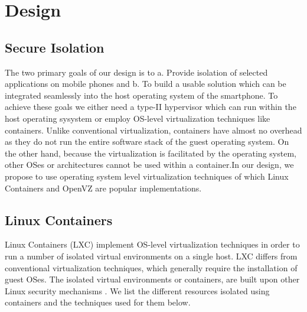 \section{Design}
\label{sec:design}

\subsection{Secure Isolation}
The two primary goals of our design is to a. Provide isolation of selected applications on mobile phones and b. To build a usable solution which can be integrated seamlessly into the host operating system of the smartphone. To achieve these goals we either need a type-II hypervisor which can run within the host operating sysystem or employ OS-level virtualization techniques like containers.  Unlike conventional virtualization, containers have almost no overhead as they do not run the entire software stack of the guest operating system.  On the other hand, because the virtualization is facilitated by the operating system, other OSes or architectures cannot be used within a container.In our design, we propose to use operating system level virtualization techniques of which Linux Containers and OpenVZ \cite{OpenVZ} are popular implementations.\\
 
\subsection{Linux Containers}
Linux Containers (LXC) implement OS-level virtualization techniques in order to run a number of isolated virtual environments on a single host.  LXC differs from conventional virtualization techniques, which generally require the installation of guest OSes.  The isolated virtual environments or containers, are built upon other Linux security mechanisms \cite{LSM}. We list the different resources isolated using containers and the techniques used for them below.


